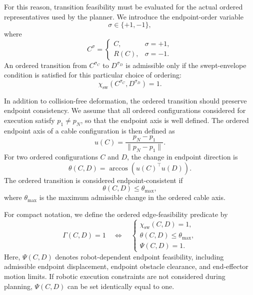 \documentclass{pas}
\begin{document}
For this reason, transition feasibility must be evaluated for the actual ordered
representatives used by the planner. We introduce the endpoint-order variable
\begin{equation}
\sigma \in \{+1,-1\},
\end{equation}
where
\begin{equation}
C^{\sigma}=
\begin{cases}
C, & \sigma=+1,\\
R(C), & \sigma=-1.
\end{cases}
\end{equation}
An ordered transition from $C^{\sigma_C}$ to $D^{\sigma_D}$ is admissible only
if the swept-envelope condition is satisfied for this particular choice of
ordering:
\begin{equation}
\chi_{\mathrm{sw}}
\left(
C^{\sigma_C},D^{\sigma_D}
\right)=1.
\end{equation}

In addition to collision-free deformation, the ordered transition should preserve
endpoint consistency. We assume that all ordered configurations considered for
execution satisfy \(p_1\neq p_N\), so that the endpoint axis is well defined.
The ordered endpoint axis of a cable configuration is then defined as
\begin{equation}
u(C)=
\frac{p_N-p_1}{\|p_N-p_1\|}.
\end{equation}
For two ordered configurations $C$ and $D$, the change in endpoint direction is
\begin{equation}
\theta(C,D)
=
\arccos\!\left(
u(C)^{\top}u(D)
\right).
\end{equation}
The ordered transition is considered endpoint-consistent if
\begin{equation}
\theta(C,D)\leq \theta_{\max},
\end{equation}
where $\theta_{\max}$ is the maximum admissible change in the ordered cable
axis.

For compact notation, we define the ordered edge-feasibility predicate by
\begin{equation}
\Gamma(C,D)=1
\quad\Longleftrightarrow\quad
\begin{cases}
\chi_{\mathrm{sw}}(C,D)=1,\\
\theta(C,D)\leq \theta_{\max},\\
\Psi(C,D)=1.
\end{cases}
\label{eq:ordered_edge_feasibility_predicate}
\end{equation}
Here, $\Psi(C,D)$ denotes robot-dependent endpoint feasibility, including
admissible endpoint displacement, endpoint obstacle clearance, and end-effector
motion limits. If robotic execution constraints are not considered during
planning, $\Psi(C,D)$ can be set identically equal to one.
\end{document}
